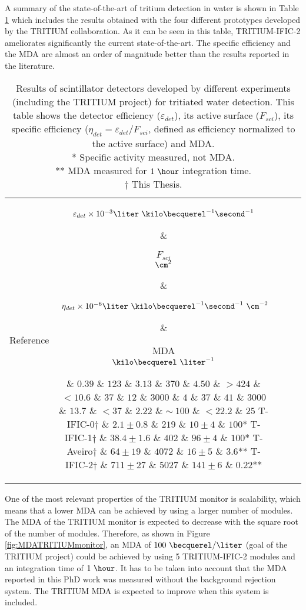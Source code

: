 \begin{enumerate}
A summary of the state-of-the-art of tritium detection in water is shown in Table \ref{tab:ComparisonResultsTritium} which includes the results obtained with the four different prototypes developed by the TRITIUM collaboration. As it can be seen in this table, TRITIUM-IFIC-2 ameliorates significantly the current state-of-the-art. The specific efficiency and the MDA are almost an order of magnitude better than the results reported in the literature.

\begin{table}[htbp]
\centering{}%
\begin{tabular}{lcrcc}
\toprule 
Reference & \parbox{5em}{$\varepsilon_{det}\times10^{-3}\\\liter~\kilo\becquerel^{-1}\second^{-1}$}  & \parbox{3.5em}{\raggedleft $F_{sci}$\\ $\cm^2$}  & \parbox{6.5em}{$~\eta_{det}\times 10^{-6}\\\liter~\kilo\becquerel^{-1}\second^{-1}~\cm^{-2}$} &  \parbox{3.5em}{MDA\\$\kilo\becquerel~\liter^{-1}$} \tabularnewline
\midrule
\midrule 
\cite{Muramatsu} & $0.39$ & $123$ & $3.13$ & $370$ \tabularnewline
\cite{Moghissi} & $4.50$ & $>424$ & $<10.6$ & $37$ \tabularnewline
\cite{Osborne} & $12$ & $3000$ & $4$ & $37$ \tabularnewline
\cite{Ratnakaran} & $41$ & $3000$ & $13.7$ & $<37$ \tabularnewline
\cite{Hofstetter1} & $2.22$ & $\sim~100$ & $<22.2$ & $25$ \tabularnewline
T-IFIC-0$\dagger$ & $2.1 \pm 0.8$ & $219$ & $10 \pm 4$ & $100$* \tabularnewline
T-IFIC-1$\dagger$ & $38.4 \pm 1.6$ & $402$ & $96 \pm 4$ & $100$* \tabularnewline
T-Aveiro$\dagger$ & $64 \pm 19$ & $4072$ & $16 \pm 5$ & $3.6$** \tabularnewline
T-IFIC-2$\dagger$ & $711 \pm 27$ & $5027$ & $141 \pm 6$ & $0.22$** \tabularnewline
\bottomrule
\end{tabular}
\caption{Results of scintillator detectors developed by different experiments (including the TRITIUM project) for tritiated water detection. This table shows the detector efficiency ($\varepsilon_{det}$), its active surface ($F_{sci}$), its specific efficiency ($\eta_{det}=\varepsilon_{det}/F_{sci}$, defined as efficiency normalized to the active surface) and MDA.\\
* Specific activity measured, not MDA.\\ 
** MDA measured for $1~\hour$ integration time.\\
$\dagger$ This Thesis.}
\label{tab:ComparisonResultsTritium}
\end{table}

One of the most relevant properties of the TRITIUM monitor is scalability, which means that a lower MDA can be achieved by using a larger number of modules. The MDA of the TRITIUM monitor is expected to decrease with the square root of the number of modules. Therefore, as shown in Figure \ref{fig:MDATRITIUMmonitor}, an MDA of  $100~\becquerel/\liter$ (goal of the TRITIUM project) could be achieved by using 5 TRITIUM-IFIC-2 modules and an integration time of $1~\hour$. It has to be taken into account that the MDA reported in this PhD work was measured without the background rejection system. The TRITIUM MDA is expected to improve when this system is included.


\end{enumerate}
